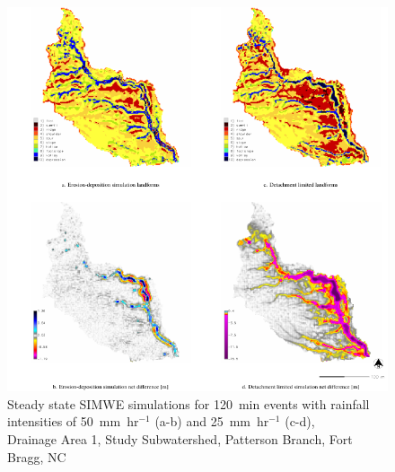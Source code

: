 \documentclass[gmd, manuscript]{copernicus}
\begin{document}
\begin{figure}
\center
\includegraphics[width=\textwidth,height=0.95\textheight,keepaspectratio]{figures/simwe.pdf}
\caption{Steady state SIMWE simulations
for 120~\unit{min} events with rainfall intensities of 50~\unit{mm~hr}$^{-1}$ (a-b)
and 25~\unit{mm~hr}$^{-1}$ (c-d),\\
Drainage Area 1, Study Subwatershed, Patterson Branch, Fort Bragg, NC}
\label{fig:simwe_simulations}
\end{figure}

\conclusions
\end{document}
